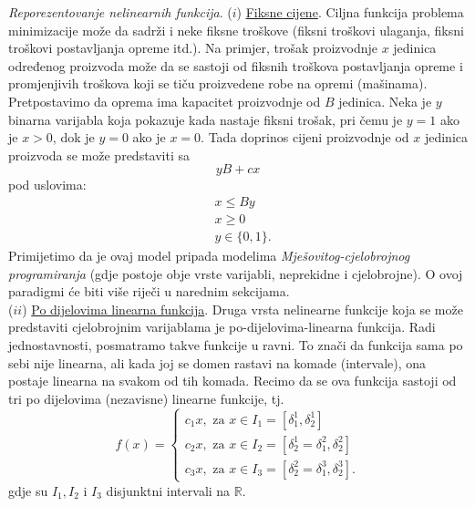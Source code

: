 \documentclass[a4paper, utf8, 11pt, colorlinks]{book}
\begin{document}
\emph{Reporezentovanje nelinearnih funkcija}. ($i$) \underline{Fiksne cijene}. Ciljna funkcija problema minimizacije može da sadrži i neke fiksne troškove (fiksni troškovi ulaganja, fiksni troškovi postavljanja opreme itd.). Na primjer, trošak proizvodnje $x$ jedinica određenog proizvoda može da se sastoji od fiksnih troškova postavljanja opreme i promjenjivih troškova koji se tiču proizvedene robe na opremi (mašinama). Pretpostavimo da oprema ima kapacitet proizvodnje od $B$ jedinica. Neka je $y$ binarna varijabla koja pokazuje kada nastaje fiksni trošak, pri čemu  je $y=1$ ako je $x >0$, dok je $y=0$ ako je $x=0$. Tada doprinos cijeni proizvodnje od $x$ jedinica proizvoda se može predstaviti sa
$$ yB + c x $$ pod uslovima:
\begin{align}
     &x \leq By \\
     & x \geq 0 \\
     & y \in \{0, 1\}.
\end{align}
Primijetimo da je ovaj model pripada modelima \emph{Mješovitog-cjelobrojnog programiranja} (gdje postoje obje vrste varijabli, neprekidne i cjelobrojne). O ovoj paradigmi će biti više riječi u narednim sekcijama. \\
($ii$) \underline{{Po dijelovima linearna funkcija}}. Druga vrsta nelinearne funkcije koja se može predstaviti cjelobrojnim varijablama je po-dijelovima-linearna funkcija. Radi jednostavnosti, posmatramo takve funkcije u ravni. To znači da funkcija sama po sebi nije linearna, ali kada joj se domen rastavi na komade (intervale), ona postaje linearna na svakom od tih komada. Recimo da se ova funkcija sastoji od tri po dijelovima (nezavisne) linearne funkcije, tj. 
$$f(x) = \begin{cases}
          c_1 x, \mbox{ za } x \in I_1 = [\delta^1_1, \delta^1_2] \\
          c_2 x, \mbox{ za } x \in I_2 = [\delta^1_2 = \delta^2_1, \delta^2_2] \\
          c_3 x, \mbox{ za } x \in I_3 = [\delta^2_2 = \delta^3_1, \delta^3_2].
      \end{cases}
$$
gdje su $I_1, I_2$ i $I_3$ disjunktni intervali na $\mathbb{R}$.
\end{document}
